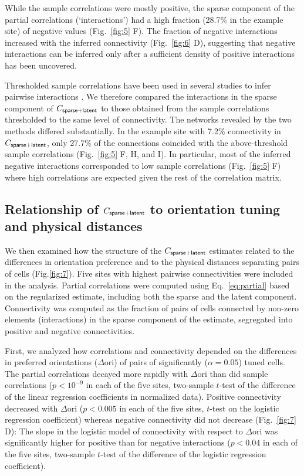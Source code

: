 While the sample correlations were mostly positive, the sparse component of the partial correlations (`interactions') had a high fraction (28.7\% in the example site) of negative values (Fig.~\ref{fig:5} F). The fraction of negative interactions increased with the inferred connectivity (Fig.~\ref{fig:6} D), suggesting that negative interactions can be inferred only after a sufficient density of positive interactions has been uncovered.

Thresholded sample correlations have been used in several studies to infer pairwise interactions \cite{Golshani:2009, Feldt:2011, Malmersjo:2013, Sadovsky:2014}.  We therefore compared the interactions in the sparse component of $C_{\sf sparse+latent}$ to those obtained from the sample correlations thresholded to the same level of connectivity. The networks revealed by the two methods differed substantially. In the example site with 7.2\% connectivity in $C_{\sf sparse+latent}$, only 27.7\% of the connections coincided with the above-threshold sample correlations (Fig.~\ref{fig:5} F, H, and I). In particular, most of the inferred negative interactions corresponded to low sample correlations (Fig.~\ref{fig:5} F) where high correlations are expected given the rest of the correlation matrix.

\subsection*{Relationship of $C_{\sf sparse+latent}$ to orientation tuning and physical distances}

We then examined how the structure of the $C_{\sf sparse+latent}$ estimates related to the differences in orientation preference and to the physical distances separating pairs of cells (Fig.\;\ref{fig:7}).  Five sites with highest pairwise connectivities were included in the analysis. Partial correlations were computed using Eq.~\ref{eq:partial} based on the regularized estimate, including both the sparse and the latent component. Connectivity was computed as the fraction of pairs of cells connected by non-zero elements (interactions) in the sparse component of the estimate, segregated into positive and negative connectivities.

First, we analyzed how correlations and connectivity depended on the differences in preferred orientations ($\Delta \mbox{ori}$) of pairs of significantly ($\alpha=0.05$) tuned cells. The partial correlations decayed more rapidly with $\Delta\mbox{ori}$ than did sample correlations ($p<10^{-9}$ in each of the five sites, two-sample $t$-test of the difference of the linear regression coefficients in normalized data). Positive connectivity decreased with $\Delta\mbox{ori}$ ($p<0.005$ in each of the five sites, $t$-test on the logistic regression coefficient) whereas negative connectivity did not decrease (Fig.~\ref{fig:7} D): The slope in the logistic model of connectivity with respect to $\Delta\mbox{ori}$ was significantly higher for positive than for negative interactions ($p<0.04$ in each of the five sites, two-sample $t$-test of the difference of the logistic regression coefficient).

